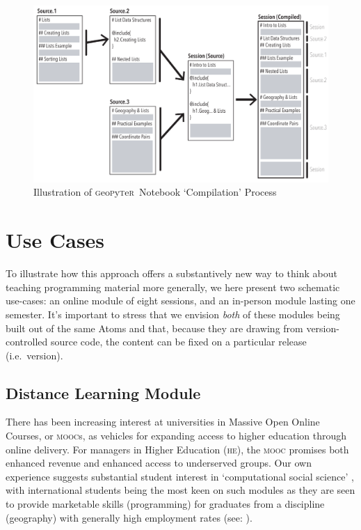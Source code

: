 \documentclass[letter, 11pt,titlepage]{article}
\newcommand{\gp}{\textsc{g}eo\textsc{p}y\textsc{t}e\textsc{r}~\/}
\newcommand{\ie}{i.e.~\/}
\begin{document}
\begin{figure}[hbtp]
  \centering
  \caption{Illustration of \gp Notebook `Compilation' Process}
  \label{fig:compiling}
  \includegraphics[width=\textwidth, angle=0]{Multiple_Documents.pdf}
\end{figure}

\section{Use Cases}\label{uses}

To illustrate how this approach offers a substantively new way to think about teaching programming material more generally, we here present two schematic use-cases: an online module of eight sessions, and an in-person module lasting one semester. It's important to stress that we envision \emph{both} of these modules being built out of the same Atoms and that, because they are drawing from version-controlled source code, the content can be fixed on a particular release (\ie version).

\subsection{Distance Learning Module}\label{an-online-module}

There has been increasing interest at universities in Massive Open Online Courses, or \textsc{mooc}s, as vehicles for expanding access to higher education through online delivery. For managers in Higher Education (\textsc{he}), the \textsc{mooc} promises both enhanced revenue and enhanced access to underserved groups. Our own experience suggests substantial student interest in `computational social science' \citep{Lazer2009}, with international students being the most keen on such modules as they are seen to provide marketable skills (programming) for graduates from a discipline (geography) with generally high employment rates (see: \citeauthor{rgs2017} \citeyear{rgs2017}).
\end{document}
